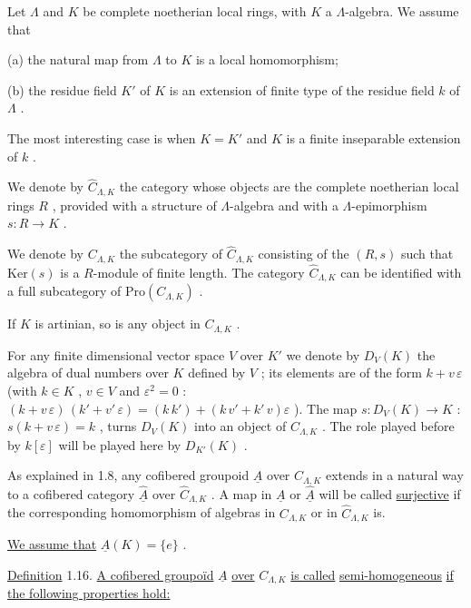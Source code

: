 Let $\Lambda$ and $K$ be complete noetherian local rings, with $K$ a $\Lambda$-algebra. We assume that

(a)  the natural map from $\Lambda$ to $K$ is a local homomorphism;

(b)  the residue field $K'$ of $K$ is an extension of finite type of the residue field $k$ of $\Lambda$ .

The most interesting case is when $K = K'$ and $K$ is a finite inseparable extension of $k$ .

We denote by $\hat{C}_{\Lambda,K}$ the category whose objects are the complete noetherian local rings $R$ , provided with a structure of $\Lambda$-algebra and with a $\Lambda$-epimorphism $s : R \longrightarrow K$ .

We denote by $C_{\Lambda,K}$ the subcategory of $\hat{C}_{\Lambda,K}$ consisting of the $(R, s)$ such that $\mathrm{Ker}(s)$ is a $R$-module of finite length. The category $\hat{C}_{\Lambda,K}$ can be identified with a full subcategory of $\mathrm{Pro}(C_{\Lambda,K})$ .

If $K$ is artinian, so is any object in $C_{\Lambda,K}$ .

For any finite dimensional vector space $V$ over $K'$ we denote by $D_V(K)$ the algebra of dual numbers over $K$ defined by $V$ ; its elements are of the form $k + v\,\varepsilon$ (with $k \in K$ , $v \in V$ and $\varepsilon^2 = 0$ : $(k + v\,\varepsilon)\,(k' + v'\,\varepsilon) = (k\,k') + (k\,v' + k'\,v)\varepsilon$  ). The map $s : D_V(K) \to K$ : $s(k + v\,\varepsilon) = k$ , turns $D_V(K)$ into an object of $C_{\Lambda,K}$ . The role played before by $k[\varepsilon]$ will be played here by $D_{K'}(K)$ .

As explained in 1.8, any cofibered groupoid $\underline{A}$ over $C_{\Lambda,K}$ extends in a natural way to a cofibered category $\hat{\underline{A}}$ over $\hat{C}_{\Lambda,K}$ . A map in $\underline{A}$ or $\hat{\underline{A}}$ will be called \underline{surjective} if the corresponding homomorphism of algebras in $C_{\Lambda,K}$ or in $\hat{C}_{\Lambda,K}$ is.


\underline{We assume that} $\underline{A}(K) = \{e\}$ .

\underline{Definition} 1.16.  \underline{A cofibered groupoïd} $\underline{A}$ \underline{over} $C_{\Lambda,K}$ \underline{is called} \underline{semi-homogeneous} \underline{if the following properties hold:}

